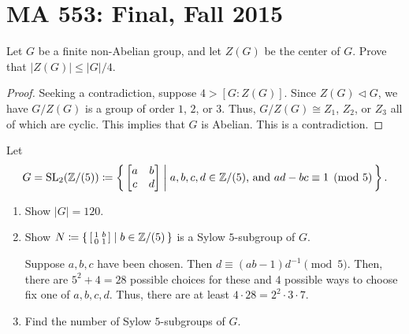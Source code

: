 \chapter{MA 553: Final, Fall 2015}
\begin{problem}
Let $G$ be a finite non-Abelian group, and let $Z(G)$ be the center of
$G$. Prove that $|Z(G)|\leq |G|/4$.
\end{problem}
\begin{proof}
Seeking a contradiction, suppose $4>[G:Z(G)]$. Since $Z(G)\lhd G$, we have
$G/Z(G)$ is a group of order $1$, $2$, or $3$. Thus, $G/Z(G)\cong Z_1$,
$Z_2$, or $Z_3$ all of which are cyclic. This implies that $G$ is
Abelian. This is a contradiction.
\end{proof}

\begin{problem}
Let
\[
G=\operatorname{SL}_2(\mathbb{Z}/(5))\coloneqq
\left\{\,\begin{bmatrix}a&b\\c&d\end{bmatrix}\;\middle|\;
\text{$a,b,c,d\in\mathbb{Z}/(5)$, and $ad-bc\equiv 1\pmod{5}$}\,\right\}.
\]
\begin{enumerate}[label=(\alph*)]
\item Show $|G|=120$.
\item Show
  $N\coloneqq\left\{\,\left[\begin{smallmatrix}1&b\\0&1\end{smallmatrix}\right]\;\middle|\;b\in\mathbb{Z}/(5)\,\right\}$
  is a Sylow $5$-subgroup of $G$.

Suppose $a,b,c$ have been chosen. Then $d\equiv
(ab-1)d^{-1}\pmod{5}$. Then, there are $5^2+4=28$ possible choices for
these and $4$ possible ways to choose fix one of $a,b,c,d$. Thus, there are
at least $4\cdot 28=2^2\cdot 3\cdot 7$.
\item Find the number of Sylow $5$-subgroups of $G$.
\end{enumerate}
\end{problem}
